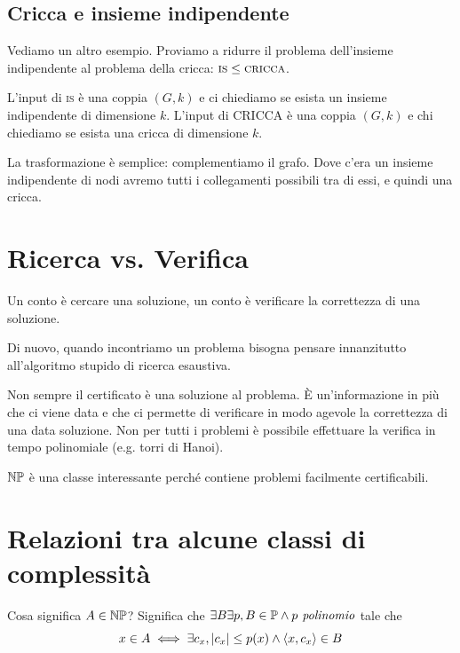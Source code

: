\subsection{Cricca e insieme indipendente}

Vediamo un altro esempio. Proviamo a ridurre il problema dell'insieme indipendente al problema della
cricca: $\textsc{is} \leq \textsc{cricca}$.

L'input di \textsc{is} è una coppia $(G,k)$ e ci chiediamo se esista un insieme indipendente di
dimensione $k$. L'input di CRICCA è una coppia $(G,k)$ e chi chiediamo se esista una cricca di
dimensione $k$.

La trasformazione è semplice: complementiamo il grafo. Dove c'era un insieme indipendente di nodi
avremo tutti i collegamenti possibili tra di essi, e quindi una cricca.

\section{Ricerca vs. Verifica}


Un conto è cercare una soluzione, un conto è verificare la correttezza di una soluzione.

Di nuovo, quando incontriamo un problema bisogna pensare innanzitutto all'algoritmo stupido di
ricerca esaustiva.


Non sempre il certificato è una soluzione al problema. È un'informazione in più che ci viene data e
che ci permette di verificare in modo agevole la correttezza di una data soluzione. Non per tutti i
problemi è possibile effettuare la verifica in tempo polinomiale (e.g. torri di Hanoi).

$\mathbb{NP}$ è una classe interessante perché contiene problemi facilmente certificabili.

\section{Relazioni tra alcune classi di complessità}

Cosa significa $A \in \mathbb{NP}$? Significa che $\exists B \exists p, B \in \mathbb{P} \land p\textit{ polinomio}$
tale che
\begin{equation*}
    x \in A \iff \exists c_{x}, |c_{x}| \leq p(x) \land \langle x, c_{x} \rangle \in B
\end{equation*}

